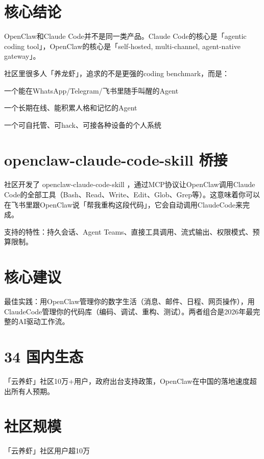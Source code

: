 \documentclass[
  10
]{article}
\begin{document}
\section{核心结论}\label{ux6838ux5fc3ux7ed3ux8bba}

OpenClaw和Claude Code并不是同一类产品。Claude Code的核心是「agentic
coding tool」，OpenClaw的核心是「self-hosted, multi-channel,
agent-native gateway」。

社区里很多人「养龙虾」，追求的不是更强的coding benchmark，而是：

一个能在WhatsApp/Telegram/飞书里随手叫醒的Agent

一个长期在线、能积累人格和记忆的Agent

一个可自托管、可hack、可接各种设备的个人系统

\section{openclaw-claude-code-skill
桥接}\label{openclaw-claude-code-skill-ux6865ux63a5}

社区开发了 openclaw-claude-code-skill ，通过MCP协议让OpenClaw调用Claude
Code的全部工具（Bash、Read、Write、Edit、Glob、Grep等）。这意味着你可以在飞书里跟OpenClaw说「帮我重构这段代码」，它会自动调用ClaudeCode来完成。

支持的特性：持久会话、Agent
Teams、直接工具调用、流式输出、权限模式、预算限制。

\section{核心建议}\label{ux6838ux5fc3ux5efaux8bae-24}

最佳实践：用OpenClaw管理你的数字生活（消息、邮件、日程、网页操作），用ClaudeCode管理你的代码库（编码、调试、重构、测试）。两者组合是2026年最完整的AI驱动工作流。

\section{34 国内生态}\label{ux56fdux5185ux751fux6001}

「云养虾」社区10万+用户，政府出台支持政策，OpenClaw在中国的落地速度超出所有人预期。

\section{社区规模}\label{ux793eux533aux89c4ux6a21}

「云养虾」社区用户超10万
\end{document}
